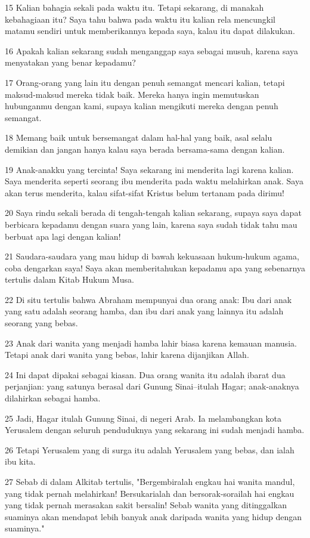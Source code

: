 \par 15 Kalian bahagia sekali pada waktu itu. Tetapi sekarang, di manakah kebahagiaan itu? Saya tahu bahwa pada waktu itu kalian rela mencungkil matamu sendiri untuk memberikannya kepada saya, kalau itu dapat dilakukan.
\par 16 Apakah kalian sekarang sudah menganggap saya sebagai musuh, karena saya menyatakan yang benar kepadamu?
\par 17 Orang-orang yang lain itu dengan penuh semangat mencari kalian, tetapi maksud-maksud mereka tidak baik. Mereka hanya ingin memutuskan hubunganmu dengan kami, supaya kalian mengikuti mereka dengan penuh semangat.
\par 18 Memang baik untuk bersemangat dalam hal-hal yang baik, asal selalu demikian dan jangan hanya kalau saya berada bersama-sama dengan kalian.
\par 19 Anak-anakku yang tercinta! Saya sekarang ini menderita lagi karena kalian. Saya menderita seperti seorang ibu menderita pada waktu melahirkan anak. Saya akan terus menderita, kalau sifat-sifat Kristus belum tertanam pada dirimu!
\par 20 Saya rindu sekali berada di tengah-tengah kalian sekarang, supaya saya dapat berbicara kepadamu dengan suara yang lain, karena saya sudah tidak tahu mau berbuat apa lagi dengan kalian!
\par 21 Saudara-saudara yang mau hidup di bawah kekuasaan hukum-hukum agama, coba dengarkan saya! Saya akan memberitahukan kepadamu apa yang sebenarnya tertulis dalam Kitab Hukum Musa.
\par 22 Di situ tertulis bahwa Abraham mempunyai dua orang anak: Ibu dari anak yang satu adalah seorang hamba, dan ibu dari anak yang lainnya itu adalah seorang yang bebas.
\par 23 Anak dari wanita yang menjadi hamba lahir biasa karena kemauan manusia. Tetapi anak dari wanita yang bebas, lahir karena dijanjikan Allah.
\par 24 Ini dapat dipakai sebagai kiasan. Dua orang wanita itu adalah ibarat dua perjanjian: yang satunya berasal dari Gunung Sinai--itulah Hagar; anak-anaknya dilahirkan sebagai hamba.
\par 25 Jadi, Hagar itulah Gunung Sinai, di negeri Arab. Ia melambangkan kota Yerusalem dengan seluruh penduduknya yang sekarang ini sudah menjadi hamba.
\par 26 Tetapi Yerusalem yang di surga itu adalah Yerusalem yang bebas, dan ialah ibu kita.
\par 27 Sebab di dalam Alkitab tertulis, "Bergembiralah engkau hai wanita mandul, yang tidak pernah melahirkan! Bersukarialah dan bersorak-sorailah hai engkau yang tidak pernah merasakan sakit bersalin! Sebab wanita yang ditinggalkan suaminya akan mendapat lebih banyak anak daripada wanita yang hidup dengan suaminya."
